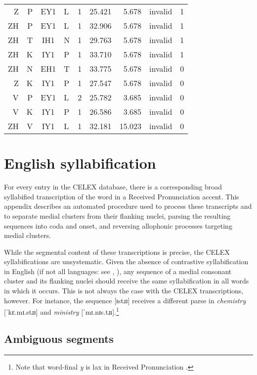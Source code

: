 \documentclass[12pt]{article}
\begin{document}
\begin{longtable}{r@{ }r@{ }c@{ }l@{ } rrrrr}
 Z & P & EY1 & L & 1 & 25.421 &  5.678 & invalid & 1 \\
ZH & P & EY1 & L & 1 & 32.906 &  5.678 & invalid & 1 \\
ZH & T & IH1 & N & 1 & 29.763 &  5.678 & invalid & 1 \\
ZH & K & IY1 & P & 1 & 33.710 &  5.678 & invalid & 1 \\
ZH & N & EH1 & T & 1 & 33.775 &  5.678 & invalid & 0 \\
 Z & K & IY1 & P & 1 & 27.547 &  5.678 & invalid & 0 \\
 V & P & EY1 & L & 2 & 25.782 &  3.685 & invalid & 0 \\
 V & K & IY1 & P & 1 & 26.586 &  3.685 & invalid & 0 \\
ZH & V & IY1 & L & 1 & 32.181 & 15.023 & invalid & 0 \\
\bottomrule
\end{longtable}

\section{English syllabification}
\label{syllabification}

For every entry in the CELEX database, there is a corresponding broad syllabified transcription of the word in a Received Pronunciation accent. This appendix describes an automated procedure used to process these transcripts and to separate medial clusters from their flanking nuclei, parsing the resulting sequences into coda and onset, and reversing allophonic processes targeting medial clusters.

While the segmental content of these transcriptions is precise, the CELEX syllabifications are unsystematic. Given the absence of contrastive syllabification in English (if not all languages: see \citealp[221]{Blevins1995}, \citealp{Elfner2006}), any sequence of a medial consonant cluster and its flanking nuclei should receive the same syllabification in all words in which it occurs. This is not always the case with the CELEX transcriptions, however. For instance, the sequence [ɪstɹɪ] receives a different parse in \emph{chemistry} [ˈkɛ.mɪ.stɹɪ] and \emph{ministry} [ˈmɪ.nɪs.tɹɪ].\footnote{Note that word-final \emph{y} is lax in Received Pronunciation \citep[][II.294]{AOE}.}

\subsection{Ambiguous segments}
\end{document}
